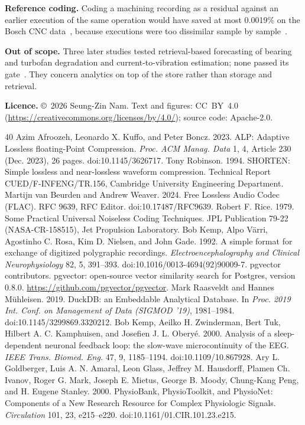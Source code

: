 \documentclass[sigconf,nonacm]{acmart}
\begin{document}
\textbf{Reference coding.} Coding a machining recording as a residual against an earlier execution of the same operation would have saved at most 0.0019\% on the Bosch CNC data~\cite{bosch}, because executions were too dissimilar sample by sample~\cite{x1}.

\textbf{Out of scope.} Three later studies tested retrieval-based forecasting of bearing and turbofan degradation and current-to-vibration estimation; none passed its gate~\cite{repo}. They concern analytics on top of the store rather than storage and retrieval.


\textbf{Licence.} \copyright~2026 Seung-Zin Nam. Text and figures: CC~BY~4.0 (\url{https://creativecommons.org/licenses/by/4.0/}); source code: Apache-2.0.

\begin{thebibliography}{40}\footnotesize\setlength{\itemsep}{0pt}
 Azim Afroozeh, Leonardo X. Kuffo, and Peter Boncz. 2023. ALP: Adaptive Lossless floating-Point Compression. \emph{Proc. ACM Manag. Data} 1, 4, Article 230 (Dec. 2023), 26 pages. doi:10.1145/3626717.
 Tony Robinson. 1994. SHORTEN: Simple lossless and near-lossless waveform compression. Technical Report CUED/F-INFENG/TR.156, Cambridge University Engineering Department.
 Martijn van Beurden and Andrew Weaver. 2024. Free Lossless Audio Codec (FLAC). RFC 9639, RFC Editor. doi:10.17487/RFC9639.
 Robert F. Rice. 1979. Some Practical Universal Noiseless Coding Techniques. JPL Publication 79-22 (NASA-CR-158515), Jet Propulsion Laboratory.
 Bob Kemp, Alpo V\"arri, Agostinho C. Rosa, Kim D. Nielsen, and John Gade. 1992. A simple format for exchange of digitized polygraphic recordings. \emph{Electroencephalography and Clinical Neurophysiology} 82, 5, 391--393. doi:10.1016/0013-4694(92)90009-7.
 pgvector contributors. pgvector: open-source vector similarity search for Postgres, version 0.8.0. \url{https://github.com/pgvector/pgvector}.
 Mark Raasveldt and Hannes M\"uhleisen. 2019. DuckDB: an Embeddable Analytical Database. In \emph{Proc. 2019 Int. Conf. on Management of Data (SIGMOD '19)}, 1981--1984. doi:10.1145/3299869.3320212.
 Bob Kemp, Aeilko H. Zwinderman, Bert Tuk, Hilbert A. C. Kamphuisen, and Josefien J. L. Obery\'e. 2000. Analysis of a sleep-dependent neuronal feedback loop: the slow-wave microcontinuity of the EEG. \emph{IEEE Trans. Biomed. Eng.} 47, 9, 1185--1194. doi:10.1109/10.867928.
 Ary L. Goldberger, Luis A. N. Amaral, Leon Glass, Jeffrey M. Hausdorff, Plamen Ch. Ivanov, Roger G. Mark, Joseph E. Mietus, George B. Moody, Chung-Kang Peng, and H. Eugene Stanley. 2000. PhysioBank, PhysioToolkit, and PhysioNet: Components of a New Research Resource for Complex Physiologic Signals. \emph{Circulation} 101, 23, e215--e220. doi:10.1161/01.CIR.101.23.e215.

\end{thebibliography}
\end{document}

